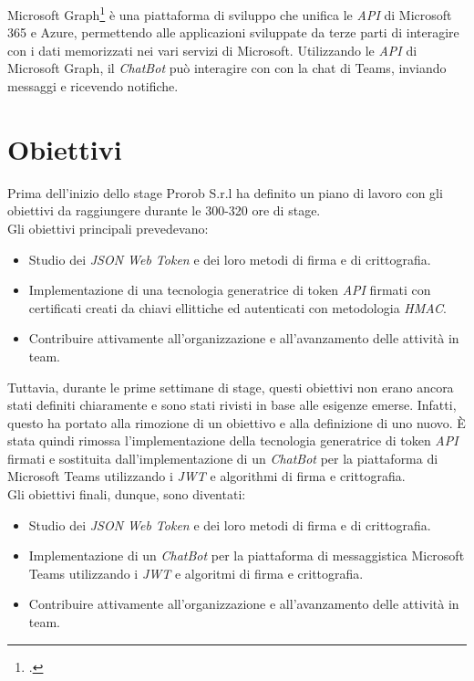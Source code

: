 Microsoft Graph\footcite{site:microsoft-graph} è una piattaforma di sviluppo che unifica le \emph{API} di Microsoft 365 e Azure, permettendo alle applicazioni sviluppate da terze parti di interagire con i dati memorizzati nei vari servizi di Microsoft.
Utilizzando le \emph{API} di Microsoft Graph, il \emph{ChatBot} può interagire con con la chat di Teams, inviando messaggi e ricevendo notifiche.

\section{Obiettivi}
Prima dell'inizio dello stage Prorob S.r.l ha definito un piano di lavoro con gli obiettivi da raggiungere durante le 300-320 ore di stage. \\

\noindent Gli obiettivi principali prevedevano:
\begin{itemize}
	\item Studio dei \emph{JSON Web Token} e dei loro metodi di firma e di crittografia.
	\item Implementazione di una tecnologia generatrice di token \emph{API} firmati con certificati creati da chiavi ellittiche ed autenticati con metodologia \emph{HMAC}.
	\item Contribuire attivamente all'organizzazione e all'avanzamento delle attività in team.
\end{itemize}

Tuttavia, durante le prime settimane di stage, questi obiettivi non erano ancora stati definiti chiaramente e sono stati rivisti in base alle esigenze emerse.
Infatti, questo ha portato alla rimozione di un obiettivo e alla definizione di uno nuovo.
È stata quindi rimossa l'implementazione della tecnologia generatrice di token \emph{API} firmati e sostituita dall'implementazione di un \emph{ChatBot} per la piattaforma di Microsoft Teams utilizzando i \emph{JWT} e algorithmi di firma e crittografia. \\

\noindent Gli obiettivi finali, dunque, sono diventati:
\begin{itemize}
	\item Studio dei \emph{JSON Web Token} e dei loro metodi di firma e di crittografia.
	\item Implementazione di un \emph{ChatBot} per la piattaforma di messaggistica Microsoft Teams utilizzando i \emph{JWT} e algoritmi di firma e crittografia.
	\item Contribuire attivamente all'organizzazione e all'avanzamento delle attività in team.
\end{itemize}